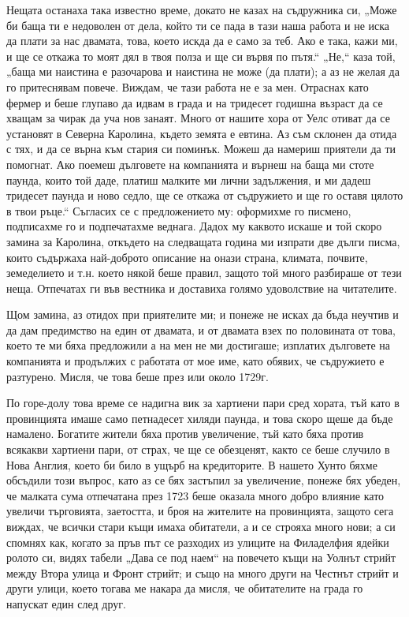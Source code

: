\documentclass[12pt]{book}
\begin{document}
Нещата останаха така известно време, докато не казах на съдружника си, „Може би баща ти е недоволен от дела, който ти се пада в тази наша работа и не иска да плати за нас двамата, това, което искда да е само за теб. Ако е така, кажи ми, и ще се откажа то моят дял в твоя полза и ще си вървя по пътя.“ „Не,“ каза той, „баща ми наистина е разочарова и наистина не може (да плати); а аз не желая да го притеснявам повече. Виждам, че тази работа не е за мен. Отраснах като фермер и беше глупаво да идвам в града и на тридесет годишна възраст да се хващам за чирак да уча нов занаят. Много от нашите хора от Уелс отиват да се установят в Северна Каролина, където земята е евтина. Аз съм склонен да отида с тях, и да се върна към стария си поминък. Можеш да намериш приятели  да ти помогнат. Ако поемеш дълговете на компанията и върнеш на баща ми стоте паунда, които той даде, платиш малките ми лични задължения, и ми дадеш тридесет паунда и ново седло, ще се откажа от съдружието и ще го оставя цялото в твои ръце.“ Съгласих се с предложението му: оформихме го писмено, подписахме го и подпечатахме веднага. Дадох му каквото искаше и той скоро замина за Каролина, откъдето на следващата година ми изпрати две дълги писма, които съдържаха най-доброто описание на онази страна, климата, почвите, земеделието и т.н. което някой беше правил, защото той много разбираше от тези неща. Отпечатах ги във вестника и доставиха голямо удоволствие на читателите.

Щом замина, аз отидох при приятелите ми; и понеже не исках да бъда неучтив и да дам предимство на един от двамата, и от двамата взех по половината от това, което те ми бяха предложили а на мен не ми достигаше; изплатих дълговете на компанията и продължих с работата от мое име, като обявих, че съдружието е разтурено. Мисля, че това беше през или около 1729г.

По горе-долу това време се надигна вик за хартиени пари сред хората, тъй като в провинцията имаше само петнадесет хиляди паунда, и това скоро щеше да бъде намалено. Богатите жители бяха против увеличение, тъй като бяха против всякакви хартиени пари, от страх, че ще се обезценят, както се беше случило в Нова Англия, което би било в ущърб на кредиторите. В нашето Хунто бяхме обсъдили този въпрос, като аз се бях застъпил за увеличение, понеже бях убеден, че малката сума отпечатана през 1723 беше оказала много добро влияние като увеличи търговията, заетостта, и броя на жителите на провинцията, защото сега виждах, че всички стари къщи имаха обитатели, а и се строяха много нови; а си спомнях как, когато за пръв път се разходих из улиците на Филаделфия ядейки ролото си, видях табели „Дава се под наем“ на повечето къщи на Уолнът стрийт между Втора улица и Фронт стрийт; и също на много други на Честнът стрийт и други улици, което тогава ме накара да мисля, че обитателите на града го напускат един след друг.
\end{document}
